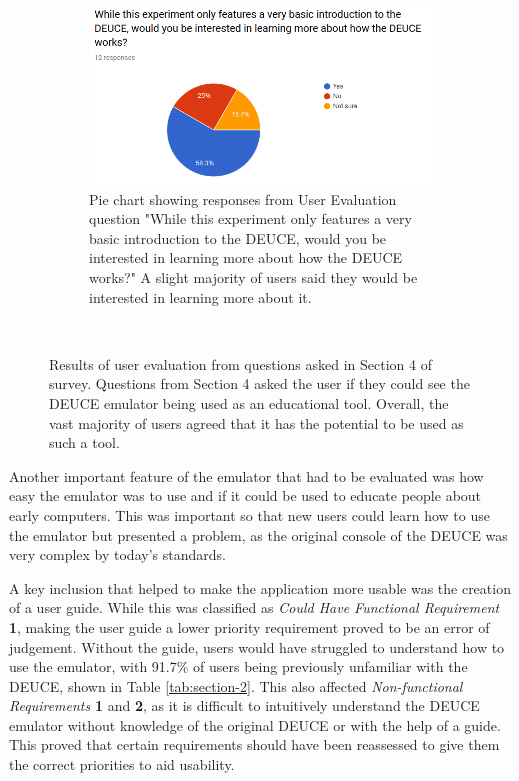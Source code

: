 \documentclass{l4proj}
\begin{document}
\begin{figure}[!t]
\begin{subfigure}[t]{0.45\textwidth}
		\label{fig:chart-6}
	\end{subfigure}
	~
	\begin{subfigure}[t]{0.45\textwidth}
		\includegraphics[width=\textwidth]{images/chart-7}
		\caption{Pie chart showing responses from User Evaluation question "While this experiment only features a very basic introduction to the DEUCE, would you be interested in learning more about how the DEUCE works?" A slight majority of users said they would be interested in learning more about it.}
		\label{fig:chart-7}
	\end{subfigure}
	~ %
	\caption{Results of user evaluation from questions asked in Section 4 of survey. Questions from Section 4 asked the user if they could see the DEUCE emulator being used as an educational tool. Overall, the vast majority of users agreed that it has the potential to be used as such a tool.}
	\label{fig:eval-usability}
\end{figure}

Another important feature of the emulator that had to be evaluated was how easy the emulator was to use and if it could be used to educate people about early computers. This was important so that new users could learn how to use the emulator but presented a problem, as the original console of the DEUCE was very complex by today's standards. 

A key inclusion that helped to make the application more usable was the creation of a user guide. While this was classified as \textit{Could Have Functional Requirement} \textbf{1}, making the user guide a lower priority requirement proved to be an error of judgement. Without the guide, users would have struggled to understand how to use the emulator, with 91.7\% of users being previously unfamiliar with the DEUCE, shown in Table \ref{tab:section-2}. This also affected \textit{Non-functional Requirements} \textbf{1} and \textbf{2}, as it is difficult to intuitively understand the DEUCE emulator without knowledge of the original DEUCE or with the help of a guide. This proved that certain requirements should have been reassessed to give them the correct priorities to aid usability.
\end{document}
